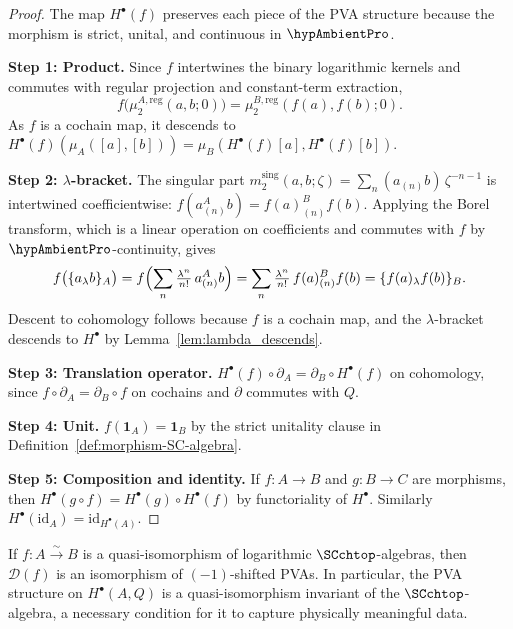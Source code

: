 \begin{proof}
The map $H^\bullet(f)$ preserves each piece of the PVA structure
because the morphism is strict, unital, and continuous in
$\hypAmbientPro$.

\medskip\noindent
\textbf{Step 1: Product.}
Since $f$ intertwines the binary logarithmic kernels and commutes with
regular projection and constant-term extraction,
\[
f\bigl(\mu_2^{A,\mathrm{reg}}(a,b;0)\bigr)
=\mu_2^{B,\mathrm{reg}}(f(a),f(b);0).
\]
As $f$ is a cochain map, it descends to
$H^\bullet(f)(\mu_A([a],[b])) = \mu_B(H^\bullet(f)[a], H^\bullet(f)[b])$.

\medskip\noindent
\textbf{Step 2: $\lambda$-bracket.}
The singular part $m_2^{\mathrm{sing}}(a,b;\zeta) = \sum_n
(a_{(n)}b)\,\zeta^{-n-1}$ is intertwined coefficientwise:
$f(a_{(n)}^A b) = f(a)_{(n)}^B f(b)$. Applying the Borel
transform, which is a linear operation on coefficients and commutes
with $f$ by $\hypAmbientPro$-continuity, gives
\[
 f\bigl(\{a {}_\lambda b\}_A\bigr)
 = f\Bigl(\sum_n \tfrac{\lambda^n}{n!}\, a_{(n)}^A b\Bigr)
 = \sum_n \tfrac{\lambda^n}{n!}\, f(a)_{(n)}^B f(b)
 = \{f(a) {}_\lambda f(b)\}_B.
\]
Descent to cohomology follows because $f$ is a cochain map, and
the $\lambda$-bracket descends to $H^\bullet$ by
Lemma~\ref{lem:lambda_descends}.

\medskip\noindent
\textbf{Step 3: Translation operator.}
$H^\bullet(f) \circ \partial_A = \partial_B \circ H^\bullet(f)$
on cohomology, since $f \circ \partial_A = \partial_B \circ f$
on cochains and $\partial$ commutes with $Q$.

\medskip\noindent
\textbf{Step 4: Unit.}
$f(\mathbf{1}_A) = \mathbf{1}_B$ by the strict unitality clause in
Definition~\textup{\ref{def:morphism-SC-algebra}}.

\medskip\noindent
\textbf{Step 5: Composition and identity.}
If $f \colon A \to B$ and $g \colon B \to C$ are morphisms,
then $H^\bullet(g \circ f) = H^\bullet(g) \circ H^\bullet(f)$
by functoriality of $H^\bullet$. Similarly
$H^\bullet(\mathrm{id}_A) = \mathrm{id}_{H^\bullet(A)}$.
\end{proof}

\begin{remark}
\label{rem:pva-descent-qi}
If $f \colon A \xrightarrow{\sim} B$ is a quasi-isomorphism
of logarithmic $\SCchtop$-algebras, then $\mathcal{D}(f)$ is
an isomorphism of $(-1)$-shifted PVAs. In particular, the PVA
structure on $H^\bullet(A,Q)$ is a quasi-isomorphism invariant
of the $\SCchtop$-algebra, a necessary condition for it to
capture physically meaningful data.
\end{remark}

